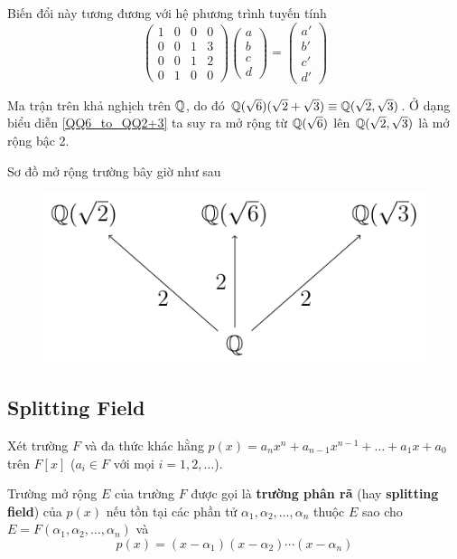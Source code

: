 Biến đổi này tương đương với hệ phương trình tuyến tính
\begin{equation*}
    \begin{pmatrix}
        1 & 0 & 0 & 0 \\
        0 & 0 & 1 & 3 \\
        0 & 0 & 1 & 2 \\
        0 & 1 & 0 & 0
    \end{pmatrix} \begin{pmatrix}
        a \\ b \\ c \\ d
    \end{pmatrix} = \begin{pmatrix}
        a' \\ b' \\ c' \\ d'
    \end{pmatrix}
\end{equation*}

Ma trận trên khả nghịch trên $\mathbb{Q}$, do đó $\mathbb{Q}(\sqrt{6})(\sqrt{2} + \sqrt{3}) \equiv \mathbb{Q}(\sqrt{2}, \sqrt{3})$. Ở dạng biểu diễn \ref{QQ6_to_QQ2+3} ta suy ra mở rộng từ $\mathbb{Q}(\sqrt{6})$ lên $\mathbb{Q}(\sqrt{2}, \sqrt{3})$ là mở rộng bậc 2.

Sơ đồ mở rộng trường bây giờ như sau

\begin{figure}[htb]
    \centering
    \includegraphics[page=2]{figures/extension_field.pdf}
\end{figure}

\subsection*{Splitting Field}

\begin{definition}
    Xét trường $F$ và đa thức khác hằng $p(x) = a_n x^n + a_{n-1} x^{n-1} + \ldots + a_1 x + a_0$ trên $F[x]$ ($a_i \in F$ với mọi $i = 1, 2, \ldots$).

    Trường mở rộng $E$ của trường $F$ được gọi là \textbf{trường phân rã} (hay \textbf{splitting field}) của $p(x)$ nếu tồn tại các phần tử $\alpha_1, \alpha_2, \ldots, \alpha_n$ thuộc $E$ sao cho $E = F(\alpha_1, \alpha_2, \ldots, \alpha_n)$ và
    \begin{equation*}
        p(x) = (x - \alpha_1) (x - \alpha_2) \cdots (x - \alpha_n)
    \end{equation*}
\end{definition}

